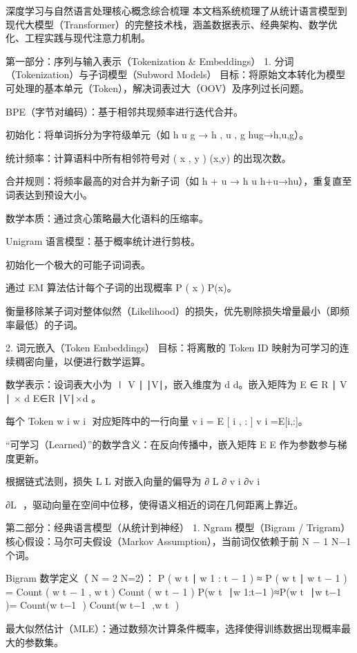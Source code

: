 深度学习与自然语言处理核心概念综合梳理
本文档系统梳理了从统计语言模型到现代大模型（Transformer）的完整技术栈，涵盖数据表示、经典架构、数学优化、工程实践与现代注意力机制。

第一部分：序列与输入表示（Tokenization & Embeddings）
1. 分词（Tokenization）与子词模型（Subword Models）
目标：将原始文本转化为模型可处理的基本单元（Token），解决词表过大（OOV）及序列过长问题。

BPE（字节对编码）：基于相邻共现频率进行迭代合并。

初始化：将单词拆分为字符级单元（如 
h
u
g
→
h
,
u
,
g
hug→h,u,g）。

统计频率：计算语料中所有相邻符号对 
(
x
,
y
)
(x,y) 的出现次数。

合并规则：将频率最高的对合并为新子词（如 
h
+
u
→
h
u
h+u→hu），重复直至词表达到预设大小。

数学本质：通过贪心策略最大化语料的压缩率。

Unigram 语言模型：基于概率统计进行剪枝。

初始化一个极大的可能子词词表。

通过 EM 算法估计每个子词的出现概率 
P
(
x
)
P(x)。

衡量移除某子词对整体似然（Likelihood）的损失，优先剔除损失增量最小（即频率最低）的子词。

2. 词元嵌入（Token Embeddings）
目标：将离散的 Token ID 映射为可学习的连续稠密向量，以便进行数学运算。

数学表示：设词表大小为 
∣
V
∣
∣V∣，嵌入维度为 
d
d。嵌入矩阵为 
E
∈
R
∣
V
∣
×
d
E∈R 
∣V∣×d
 。

每个 Token 
w
i
w 
i
​
  对应矩阵中的一行向量 
v
i
=
E
[
i
,
:
]
v 
i
​
 =E[i,:]。

“可学习（Learned）”的数学含义：在反向传播中，嵌入矩阵 
E
E 作为参数参与梯度更新。

根据链式法则，损失 
L
L 对嵌入向量的偏导为 
∂
L
∂
v
i
∂v 
i
​
 
∂L
​
 ，驱动向量在空间中位移，使得语义相近的词在几何距离上靠近。

第二部分：经典语言模型（从统计到神经）
1. Ngram 模型（Bigram / Trigram）
核心假设：马尔可夫假设（Markov Assumption），当前词仅依赖于前 
N
−
1
N−1 个词。

Bigram 数学定义（
N
=
2
N=2）：
P
(
w
t
∣
w
1
:
t
−
1
)
≈
P
(
w
t
∣
w
t
−
1
)
=
Count
(
w
t
−
1
,
w
t
)
Count
(
w
t
−
1
)
P(w 
t
​
 ∣w 
1:t−1
​
 )≈P(w 
t
​
 ∣w 
t−1
​
 )= 
Count(w 
t−1
​
 )
Count(w 
t−1
​
 ,w 
t
​
 )
​
 

最大似然估计（MLE）：通过数频次计算条件概率，选择使得训练数据出现概率最大的参数集。

